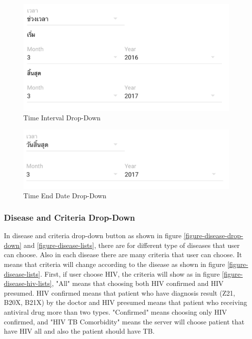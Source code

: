     \FloatBarrier
        \begin{figure}[h!]
            \centering
        		\includegraphics[width=\linewidth]{images/chapter-06/time-interval.png}
            	\caption{Time Interval Drop-Down}
        		\label{figure-time-interval-drop-down}
        \end{figure}
    \FloatBarrier
    
    \FloatBarrier
        \begin{figure}[h!]
            \centering
        		\includegraphics[width=\linewidth]{images/chapter-06/time-end-date.png}
            	\caption{Time End Date Drop-Down}
        		\label{figure-time-end-date-drop-down}
        \end{figure}
    \FloatBarrier
    
\subsubsection{Disease and Criteria Drop-Down}
    In disease and criteria drop-down button as shown in figure \ref{figure-disease-drop-down} and \ref{figure-disease-lists}, there are for different type of diseases that user can choose. Also in each disease there are many criteria that user can choose. It means that criteria will change according to the disease as shown in figure \ref{figure-disease-lists}. First, if user choose HIV, the criteria will show as in figure \ref{figure-disease-hiv-lists}, "All" means that choosing both HIV confirmed and HIV presumed. HIV confirmed means that patient who have diagnosis result (Z21, B20X, B21X) by the doctor and HIV presumed means that patient who receiving antiviral drug more than two types. "Confirmed" means choosing only HIV confirmed, and "HIV TB Comorbidity" means the server will choose patient that have HIV all and also the patient should have TB.
    
